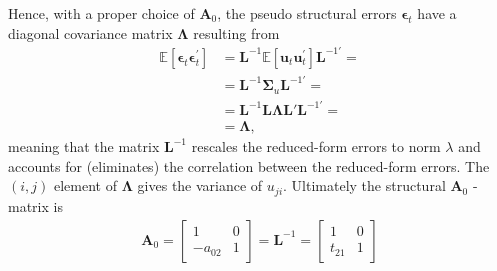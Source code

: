 \documentclass[a4paper,11pt,listof=nochaptergap,oneside,pointednumbers,bibtotoc,bigheadings,liststotoc,hidelinks]{scrbook}
\theoremstyle{mysatz}
\theoremstyle{mydefinition}
\theoremstyle{mytheorem}
\theoremstyle{mybemerkung}
\newcommand{\vect}[1]{\boldsymbol{\mathbf{#1}}}
\begin{document}
Hence, with a proper choice of $\vect{A}_0$, the pseudo structural errors $\vect{\epsilon}_t$ have a diagonal covariance matrix $\vect{\Lambda}$ resulting from 
\begin{equation} \label{eq:svar22}
\begin{split}
	\mathbb{E}[\vect{\epsilon}_t\vect{\epsilon}_t^'] & = \vect{L}^{-1} \mathbb{E}[\vect{u}_t\vect{u}_t^']\vect{L}^{-1'} = \\
										& = \vect{L}^{-1} \vect{\Sigma}_u \vect{L}^{-1'} = \\
										& = \vect{L}^{-1} \vect{L \Lambda L}' \vect{L}^{-1'} = \\
										& = \vect{\Lambda},
\end{split}								
\end{equation}
meaning that the matrix $\vect{L}^{-1}$ rescales the reduced-form errors to norm $\lambda$ and accounts for (eliminates) the correlation between the reduced-form errors. The $(i, j)$ element of $\vect{\Lambda}$ gives the variance of $u_{ji}$. Ultimately the structural $\vect{A}_0$ - matrix is
\begin{equation} \label{eq:svar23}
\begin{split}
	\vect{A}_0 = \begin{bmatrix}
    					1 & 0 \\
					-a_{02} & 1
 					\end{bmatrix} = 
					\vect{L}^{-1} = 
						\begin{bmatrix}
    						1 & 0 \\
						t_{21} & 1
 						\end{bmatrix}
\end{split}								
\end{equation}
\end{document}

